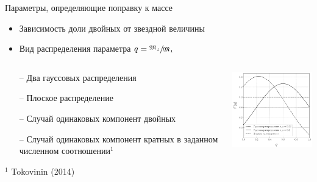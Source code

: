 \documentclass[pdf]{beamer}
\begin{document}
	\begin{frame}{Параметры, определяющие поправку к массе}
		\begin{itemize}
			\item Зависимость доли двойных от звездной величины
			\item Вид распределения параметра $ q = \sfrac{\mathfrak{M_2}}{\mathfrak{M_1}} $
		\end{itemize}
		\pause

		\begin{columns}
			\begin{column}{0.47\textwidth}
			\begin{itemize}
				\item[--] Два гауссовых распределения
				\item[--] Плоское распределение
				\item[--] Случай одинаковых компонент двойных
				\item[--] Случай одинаковых компонент кратных в  заданном численном соотношении$^1$
				
			\end{itemize}	
			\hspace{0.2cm}	
			{\footnotesize $^1$ Tokovinin (2014)}
			\end{column}
			
			\begin{column}{0.5\textwidth}
				
				\includegraphics[width=5cm]{images/q_dists.pdf}
			\end{column}
		\end{columns}
		\vspace{-0.5cm}

	\end{frame}
	
\end{document}
